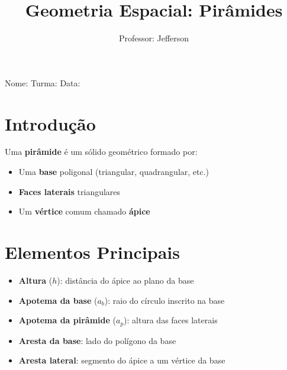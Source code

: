 \documentclass[11pt]{article}
\title{\textcolor{myblue}{Geometria Espacial: Pirâmides}}
\author{Professor: Jefferson}
\date{}
\begin{document}
\maketitle
\vspace{-1cm}

\begin{center}
\large{Nome: \underline{\hspace{8cm}} \quad Turma: \underline{\hspace{3cm}} \quad Data: \underline{\hspace{3cm}}}
\end{center}

\begin{multicols}{2}

\section*{Introdução}
Uma \textbf{pirâmide} é um sólido geométrico formado por:
\begin{itemize}[leftmargin=*]
    \item Uma \textbf{base} poligonal (triangular, quadrangular, etc.)
    \item \textbf{Faces laterais} triangulares
    \item Um \textbf{vértice} comum chamado \textbf{ápice}
\end{itemize}

\begin{center}
\end{center}

\section*{Elementos Principais}
\begin{itemize}[leftmargin=*]
    \item \textbf{Altura} ($h$): distância do ápice ao plano da base
    \item \textbf{Apotema da base} ($a_b$): raio do círculo inscrito na base
    \item \textbf{Apotema da pirâmide} ($a_p$): altura das faces laterais
    \item \textbf{Aresta da base}: lado do polígono da base
    \item \textbf{Aresta lateral}: segmento do ápice a um vértice da base
\end{itemize}


\end{multicols}
\end{document}

